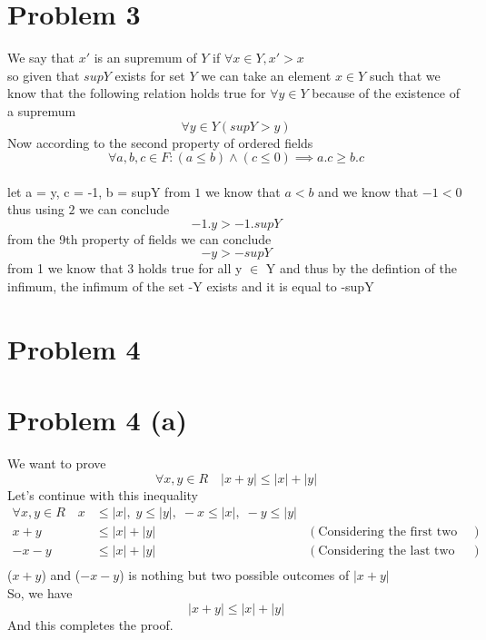 \documentclass{article}
\begin{document}
\section*{Problem 3}
We say that \(x'\) is an supremum of \(Y\) if \(\forall x \in Y, x' > x \)\\
so given that \(sup Y\) exists for set \(Y\) we can take an element \(x \in Y\) such that we know 
that the following relation holds true for \(\forall y \in Y\) because of the existence of a supremum
\[
\forall y \in Y (supY > y)  \tag{1}
\]
Now according to the second property of ordered fields\\ \[
\forall a,b,c \in F: (a \leq b) 
\land(c \leq 0) \implies a.c \geq b.c \tag{2}
\] \\let a = y, c = -1, b = supY
from \(1\) we know that \(a < b \) and we know that \(-1 < 0 \)
thus using \(2\) we can conclude 
\[
   -1.y > -1.supY
\] from the 9th property of fields we can conclude
\[
   -y > -supY \tag{3}
\]
from 1 we know that 3 holds true for all y \(\in\) Y
and thus by the defintion of the infimum, the infimum of the set -Y exists and it is equal to -supY



\section*{Problem 4}
\section*{Problem 4 (a)}
We want to prove
\[
   \forall x,y \in R \quad |x + y| \leq |x| + |y|
\]
Let's continue with this inequality
\begin{align*}
   \forall x,y \in R \quad x &\leq |x|, \;  y \leq |y|, \; -x \leq |x|, \;  -y \leq |y| \\
   x + y &\leq |x| + |y| &(\text{Considering the first two inequalities above}) \\
   -x - y &\leq |x| + |y| &(\text{Considering the last two inequalities above}) \\
\end{align*}
(\(x+y\)) and (\(-x-y\)) is nothing but two possible outcomes of \(|x+y|\) \\
So, we have
\[
   |x + y| \leq |x| + |y|
\]
And this completes the proof.\\
\end{document}
